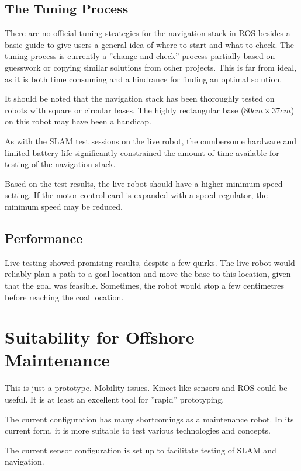 \subsection{The Tuning Process}

There are no official tuning strategies for the navigation stack in \ac{ROS} besides a basic guide to give users a general idea of where to start and what to check\cite{ROS_navigation_tuning}. The tuning process is currently a ''change and check'' process partially based on guesswork or copying similar solutions from other projects. This is far from ideal, as it is both time consuming and a hindrance for finding an optimal solution. 

It should be noted that the navigation stack has been thoroughly tested on robots with square or circular bases. The highly rectangular base ($80cm \times 37cm$) on this robot may have been a handicap.

As with the \ac{SLAM} test sessions on the live robot, the cumbersome hardware and limited battery life significantly constrained the amount of time available for testing of the navigation stack. 

Based on the test results, the live robot should have a higher minimum speed setting. If the motor control card is expanded with a speed regulator, the minimum speed may be reduced.

\subsection{Performance}

Live testing showed promising results, despite a few quirks. The live robot would reliably plan a path to a goal location and move the base to this location, given that the goal was feasible. Sometimes, the robot would stop a few centimetres before reaching the coal location.

\section{Suitability for Offshore Maintenance}

This is just a prototype. Mobility issues.
Kinect-like sensors and ROS could be useful. It is at least an excellent tool for ''rapid'' prototyping.

The current configuration has many shortcomings as a maintenance robot. In its current form, it is more suitable to test various technologies and concepts. 

The current sensor configuration is set up to facilitate testing of \ac{SLAM} and navigation.

